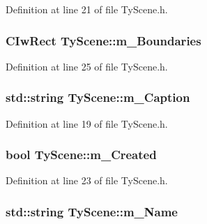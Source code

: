 Definition at line 21 of file TyScene.h.

\hypertarget{class_ty_scene_ae51934772965f8104eafcaab3b730e3a}{
\subsubsection[{m\_\-Boundaries}]{\setlength{\rightskip}{0pt plus 5cm}CIwRect {\bf TyScene::m\_\-Boundaries}}}
\label{class_ty_scene_ae51934772965f8104eafcaab3b730e3a}


Definition at line 25 of file TyScene.h.

\hypertarget{class_ty_scene_a357f5bb0add663dfe7133073163b880c}{
\subsubsection[{m\_\-Caption}]{\setlength{\rightskip}{0pt plus 5cm}std::string {\bf TyScene::m\_\-Caption}}}
\label{class_ty_scene_a357f5bb0add663dfe7133073163b880c}


Definition at line 19 of file TyScene.h.

\hypertarget{class_ty_scene_a5dddd2fb7a5dd01525c2a007c29285a1}{
\subsubsection[{m\_\-Created}]{\setlength{\rightskip}{0pt plus 5cm}bool {\bf TyScene::m\_\-Created}}}
\label{class_ty_scene_a5dddd2fb7a5dd01525c2a007c29285a1}


Definition at line 23 of file TyScene.h.

\hypertarget{class_ty_scene_a310557de7a16133cd2d189e03cb395ac}{
\subsubsection[{m\_\-Name}]{\setlength{\rightskip}{0pt plus 5cm}std::string {\bf TyScene::m\_\-Name}}}
\label{class_ty_scene_a310557de7a16133cd2d189e03cb395ac}


